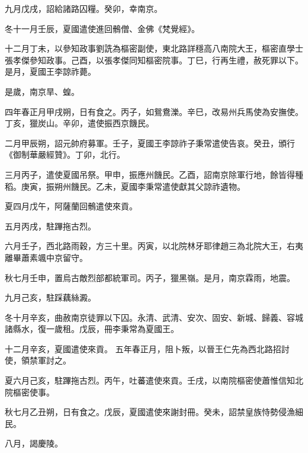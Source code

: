 \begin{pinyinscope}
 九月戊戌，詔給諸路囚糧。癸卯，幸南京。



 冬十一月壬辰，夏國遣使進回鶻僧、金佛《梵覺經》。



 十二月丁未，以參知政事劉詵為樞密副使，東北路詳穩高八南院大王，樞密直學士張孝傑參知政事。己酉，以張孝傑同知樞密院事。丁巳，行再生禮，赦死罪以下。是月，夏國王李諒祚薨。



 是歲，南京旱、蝗。



 四年春正月甲戌朔，日有食之。丙子，如鴛鴦濼。辛巳，改易州兵馬使為安撫使。丁亥，獵炭山。辛卯，遣使振西京饑民。



 二月甲辰朔，詔元帥府募軍。壬子，夏國王李諒祚子秉常遣使告哀。癸丑，頒行《御制華嚴經贊》。丁卯，北行。



 三月丙子，遣使夏國吊祭。甲申，振應州饑民。乙酉，詔南京除軍行地，餘皆得種稻。庚寅，振朔州饑民。乙未，夏國李秉常遣使獻其父諒祚遺物。



 夏四月戊午，阿薩蘭回鶻遣使來貢。



 五月丙戌，駐蹕拖古烈。



 六月壬子，西北路雨穀，方三十里。丙寅，以北院林牙耶律趙三為北院大王，右夷離畢蕭素颯中京留守。



 秋七月壬申，置烏古敵烈部都統軍司。丙子，獵黑嶺。是月，南京霖雨，地震。



 九月己亥，駐踩藕絲澱。



 冬十月辛亥，曲赦南京徒罪以下囚。永清、武清、安次、固安、新城、歸義、容城諸縣水，復一歲租。戊辰，冊李秉常為夏國王。



 十二月辛亥，夏國遣使來貢。
 五年春正月，阻卜叛，以晉王仁先為西北路招討使，領禁軍討之。



 夏六月己亥，駐蹕拖古烈。丙午，吐蕃遣使來貢。壬戌，以南院樞密使蕭惟信知北院樞密使事。



 秋七月乙丑朔，日有食之。戊辰，夏國遣使來謝封冊。癸未，詔禁皇族恃勢侵漁細民。



 八月，謁慶陵。




\end{pinyinscope}
